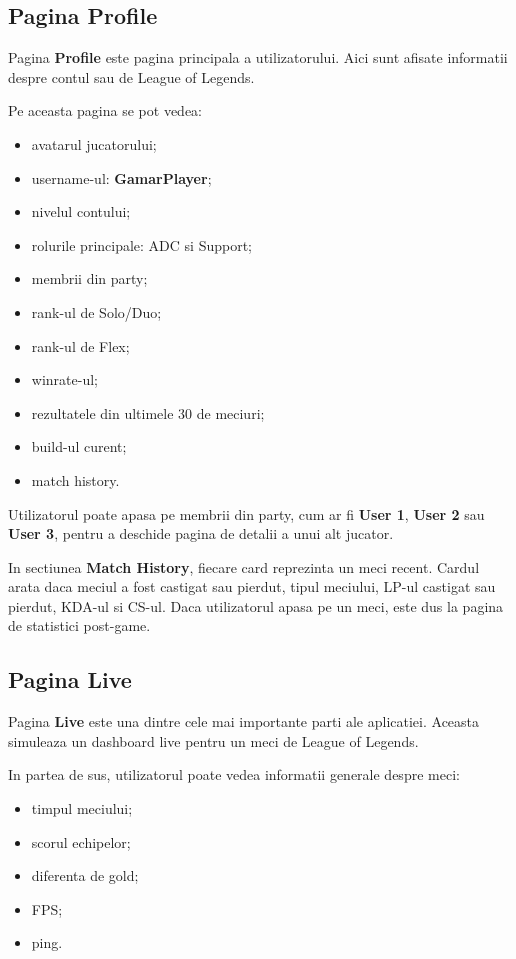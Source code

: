 \documentclass[12pt,a4paper]{article}
\begin{document}
\subsection{Pagina Profile}

Pagina \textbf{Profile} este pagina principala a utilizatorului. Aici sunt afisate informatii despre contul sau de League of Legends.

Pe aceasta pagina se pot vedea:

\begin{itemize}
    \item avatarul jucatorului;
    \item username-ul: \textbf{GamarPlayer};
    \item nivelul contului;
    \item rolurile principale: ADC si Support;
    \item membrii din party;
    \item rank-ul de Solo/Duo;
    \item rank-ul de Flex;
    \item winrate-ul;
    \item rezultatele din ultimele 30 de meciuri;
    \item build-ul curent;
    \item match history.
\end{itemize}

Utilizatorul poate apasa pe membrii din party, cum ar fi \textbf{User 1}, \textbf{User 2} sau \textbf{User 3}, pentru a deschide pagina de detalii a unui alt jucator.

In sectiunea \textbf{Match History}, fiecare card reprezinta un meci recent. Cardul arata daca meciul a fost castigat sau pierdut, tipul meciului, LP-ul castigat sau pierdut, KDA-ul si CS-ul. Daca utilizatorul apasa pe un meci, este dus la pagina de statistici post-game.

\subsection{Pagina Live}

Pagina \textbf{Live} este una dintre cele mai importante parti ale aplicatiei. Aceasta simuleaza un dashboard live pentru un meci de League of Legends.

In partea de sus, utilizatorul poate vedea informatii generale despre meci:

\begin{itemize}
    \item timpul meciului;
    \item scorul echipelor;
    \item diferenta de gold;
    \item FPS;
    \item ping.
\end{itemize}
\end{document}
